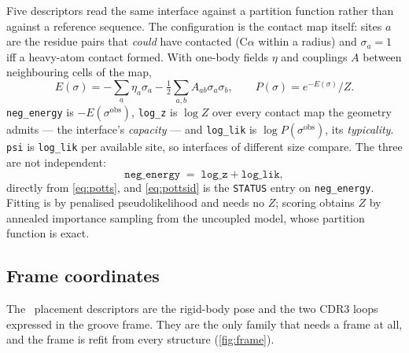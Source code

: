 \documentclass[11pt,a4paper]{article}
\newcommand{\dsc}[1]{\texttt{#1}}
\begin{document}
Five descriptors read the same interface against a partition function rather than against a
reference sequence. The configuration is the contact map itself: sites $a$ are the residue pairs
that \emph{could} have contacted (C$\alpha$ within a radius) and $\sigma_a = 1$ iff a heavy-atom
contact formed. With one-body fields $\eta$ and couplings $A$ between neighbouring cells of the map,
%
\begin{equation}
E(\sigma) = -\sum_a \eta_a \sigma_a - \tfrac{1}{2}\sum_{a,b} A_{ab}\sigma_a\sigma_b,
\qquad
P(\sigma) = e^{-E(\sigma)}/Z .
\label{eq:potts}
\end{equation}
%
\dsc{neg\_energy} is $-E(\sigma^{\mathrm{obs}})$, \dsc{log\_z} is $\log Z$ over every contact map the
geometry admits --- the interface's \emph{capacity} --- and \dsc{log\_lik} is $\log P(\sigma^{\mathrm
{obs}})$, its \emph{typicality}. \dsc{psi} is \dsc{log\_lik} per available site, so interfaces of
different size compare. The three are not independent:
%
\begin{equation}
\dsc{neg\_energy} \;=\; \dsc{log\_z} + \dsc{log\_lik},
\label{eq:pottsid}
\end{equation}
%
directly from \cref{eq:potts}, and \cref{eq:pottsid} is the \texttt{STATUS} entry on
\dsc{neg\_energy}. Fitting is by penalised pseudolikelihood and needs no $Z$; scoring obtains $Z$ by
annealed importance sampling from the uncoupled model, whose partition function is exact.

\subsection{Frame coordinates}
\label{sec:frame}

The \nOpFrame\ placement descriptors are the rigid-body pose and the two CDR3 loops expressed in the
groove frame. They are the only family that needs a frame at all, and the frame is refit from every
structure (\cref{fig:frame}).
\end{document}

